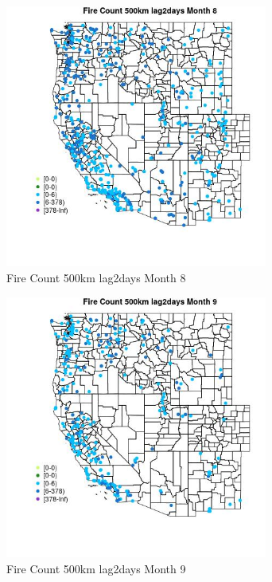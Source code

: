 \begin{figure} 
\centering  
\includegraphics[width=0.77\textwidth]{Code_Outputs/Report_ML_input_PM25_Step4_part_e_de_duplicated_aves_compiled_2019-05-18wNAs_MapObsMo8Fire_Count_500km_lag2days.jpg} 
\caption{\label{fig:Report_ML_input_PM25_Step4_part_e_de_duplicated_aves_compiled_2019-05-18wNAsMapObsMo8Fire_Count_500km_lag2days}Fire Count 500km lag2days Month 8} 
\end{figure} 
 

\begin{figure} 
\centering  
\includegraphics[width=0.77\textwidth]{Code_Outputs/Report_ML_input_PM25_Step4_part_e_de_duplicated_aves_compiled_2019-05-18wNAs_MapObsMo9Fire_Count_500km_lag2days.jpg} 
\caption{\label{fig:Report_ML_input_PM25_Step4_part_e_de_duplicated_aves_compiled_2019-05-18wNAsMapObsMo9Fire_Count_500km_lag2days}Fire Count 500km lag2days Month 9} 
\end{figure} 
 

